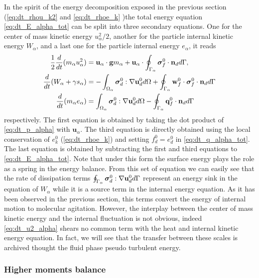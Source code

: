 In the spirit of the energy decomposition exposed in the previous section (\ref{eq:dt_rhou_k2} and \ref{eq:dt_rhoe_k} )the total energy equation \ref{eq:dt_E_alpha_tot} can be split into three secondary equations. 
One for the center of mass kinetic energy $u_\alpha^2/2$, another for the particle internal kinetic energy $W_\alpha$, and a last one for the particle internal energy $e_\alpha$, it reads
\begin{align}
    \label{eq:dt_u2_alpha}
    \frac{1}{2}\frac{d}{dt} (m_\alpha u_\alpha^2)
    &= 
    \textbf{u}_\alpha\cdot
    \textbf{g}m_\alpha
    + 
    \textbf{u}_\alpha\cdot
    \oint_{\Gamma_\alpha} \bm\sigma_f^0 \cdot \textbf{n}_d d\Gamma,\\
    \label{eq:dt_w2_alpha}
    \frac{d}{dt} (W_\alpha + \gamma s_\alpha)
    &= 
    - \int_{\Omega_\alpha}  \bm{\sigma}_d^0 : \mathbf{\nabla}\textbf{u}_d^0  d\Omega
    + \oint_{\Gamma_\alpha} \textbf{w}_f^0 \cdot \bm{\sigma}_f^0 \cdot \textbf{n}_d  d\Gamma
    \\
     \label{eq:dt_e_alpha}
    \frac{d}{dt} (m_\alpha e_\alpha )
    &= 
     \int_{\Omega_\alpha}  \bm{\sigma}_d^0 : \mathbf{\nabla}\textbf{u}_d^0   d\Omega
    -  \oint_{\Gamma_\alpha} \textbf{q}_f^0\cdot \textbf{n}_d  d\Gamma 
\end{align}
respectively. 
The first equation is obtained by taking the dot product of \ref{eq:dt_p_alpha} with $\textbf{u}_\alpha$. 
The third equation is directly obtained using the local conservation of $e_k^0$ (\ref{eq:dt_rhoe_k}) and setting $f_d^0 = e_d^0$ in \ref{eq:dt_q_alpha_tot}.
The last equation is obtained by subtracting the first and third equations to \ref{eq:dt_E_alpha_tot}. 
Note that under this form the surface energy plays the role as a spring in the energy balance.   
From this set of equation we can easily see that the rate of dissipation terms $\oint_{\Gamma_\alpha} \bm{\sigma}_d^0 : \mathbf{\nabla}\textbf{u}_d^0 d\Gamma$ represent an energy sink in the equation of $W_\alpha$ while it is a source term in the internal energy equation. 
As it has been observed in the previous section, this terms convert the energy of internal motion to molecular agitation. 
However, the interplay between the center of mass  kinetic energy and the internal fluctuation is not obvious, indeed \ref{eq:dt_u2_alpha} shears no common term with the heat and internal kinetic energy equation.
In fact, we will see that the transfer between these scales is archived thought the fluid phase pseudo turbulent energy. 



\subsubsection{Higher moments balance}


